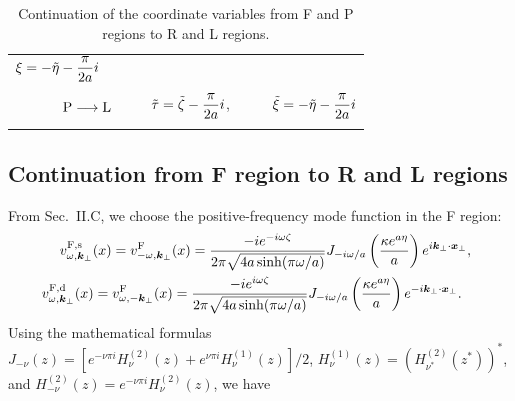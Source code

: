 \documentclass[aps,prd,preprintnumbers,nofootinbib,showpacs,11pt]{revtex4}%
\begin{document}
\begin{widetext}
\begin{center}
\begin{table}[t]
\begin{tabular}{lll}
 $\displaystyle{\xi=-\tilde\eta-{\pi \over 2a}i}$
\\
\\
~~~~~~
 $ {\rm P}  \longrightarrow {\rm L}$ ~~~&
 $\displaystyle{\tilde\tau=\tilde\zeta-{\pi \over 2a }i}$,~~~~&
 $\displaystyle{\tilde\xi=-\tilde\eta-{\pi \over 2a}i}$\\
\\
\hline
\end{tabular}
\label{tabletwo}
\caption{Continuation of the coordinate variables from F and P regions to R and L regions.}
\end{table}
\end{center}



\subsection{Continuation from F region to R and L regions}
From Sec.~II.C, we choose the positive-frequency mode function in the F region: 
\begin{eqnarray}
&&\hspace{-5mm}
v_{\omega,{\bm k}_\perp}^{\F,\s}(x)=v_{-\omega,{\bm k}_\perp}^\F(x)=
{-ie^{-i\omega\zeta}\over 2\pi\sqrt{4a\sinh (\pi \omega/a)}}
J_{-i\omega/a}\left({\kappa e^{a\eta}\over a}\right)
e^{i\bm k_\perp\cdot \bm x_\perp},
\label{vfs}
\\  &&\hspace{-5mm}
  v_{\omega,{\bm k}_\perp}^{\F,\d}(x)=v_{\omega,-{\bm k}_\perp}^\F(x)=
{-ie^{i\omega\zeta}\over 2\pi\sqrt{4a\sinh (\pi \omega/a)}}
J_{-i\omega/a}\left({\kappa e^{a\eta}\over a}\right)
e^{-i\bm k_\perp\cdot \bm x_\perp}.
  ~~
\label{vfd}
\end{eqnarray}
Using the mathematical formulas $J_{-\nu}(z)=[e^{-\nu\pi i}H_\nu^{(2)}(z)+e^{\nu\pi i}H_\nu^{(1)}(z)]/2$, 
$H_\nu^{(1)}(z)=(H_{\nu^*}^{(2)}(z^*))^*$, and $H_{-\nu}^{(2)}(z)=e^{-\nu\pi i}H_\nu^{(2)}(z)$, we have
\begin{eqnarray}

\end{eqnarray}
\end{widetext}
\end{document}
